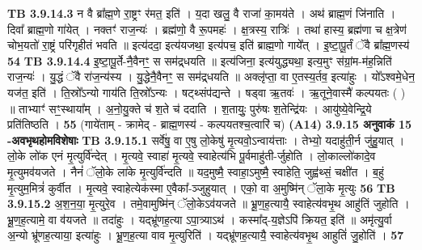 \documentclass[17pt]{extarticle}
\begin{document}
{{{{{{{{{{{{{{{{{{{{{{                  \newline
                                \textbf{ TB 3.9.14.3} \newline
                  न वै ब्रा᳚ह्म॒णे रा॒ष्ट्रꣳ र॑मत॒ इति॑ । य॒दा खलु॒ वै राजा॑ का॒मय॑ते । अथ॑ ब्राह्म॒णं जि॑नाति । दिवा᳚ ब्राह्म॒णो गा॑येत् । नक्तꣳ॑ राज॒न्यः॑ । ब्रह्म॑णो॒ वै रू॒पमहः॑ । क्ष॒त्रस्य॒ रात्रिः॑ । तथा॑ हास्य॒ ब्रह्म॑णा च क्ष॒त्रेण॑ चोभ॒यतो॑ रा॒ष्ट्रं परि॑गृहीतं भवति ॥ इत्य॑ददा॒ इत्य॑यजथा॒ इत्य॑पच॒ इति॑ ब्राह्म॒णो गाये᳚त् । इ॒ष्टा॒पू॒र्तं ॅवै ब्रा᳚ह्म॒णस्य॑ \textbf{ 54} \newline
                  \newline
                                \textbf{ TB 3.9.14.4} \newline
                  इ॒ष्टा॒पू॒र्ते-नै॒वैनꣳ॒॒ स सम॑द्र्धयति ॥ इत्य॑जिना॒ इत्य॑युद्ध्यथा॒ इत्य॒मुꣳ स॑ग्रां॒म-म॑ह॒न्निति॑ राज॒न्यः॑ । यु॒द्धं ॅवै रा॑ज॒न्य॑स्य । यु॒द्धेनै॒वैनꣳ॒॒ स सम॑द्र्धयति ॥ अक्लृ॑प्ता॒ वा ए॒तस्य॒र्तव॒ इत्या॑हुः । यो᳚ऽश्वमे॒धेन॒ यज॑त॒ इति॑ । ति॒स्रो᳚ऽन्यो गाय॑ति ति॒स्रो᳚ऽन्यः । षट्थ्संप॑द्यन्ते । षड्वा ऋ॒तवः॑ । ऋ॒तूने॒वास्मै॑ कल्पयतः ( ) ॥ ताभ्याꣳ॑ सꣳ॒॒स्थाया᳚म् । अ॒नो॒यु॒क्ते च॑ श॒ते च॑ ददाति । श॒तायुः॒ पुरु॑षः श॒तेन्द्रि॑यः । आयु॑ष्ये॒वेन्द्रि॒ये प्रति॑तिष्ठति । \textbf{ 55} \newline
                  \newline
                                    (गाये॑ताम् - क्रामेद् - ब्राह्म॒णस्य॑ - कल्पयतश्च॒त्वारि॑ च) \textbf{(A14)} \newline \newline
                \textbf{ 3.9.15    अनुवाकं   15 -अवभृथहोमविशेषाः} \newline
                                \textbf{ TB 3.9.15.1} \newline
                  सर्वे॑षु॒ वा ए॒षु लो॒केषु॑ मृ॒त्यवो॒ऽन्वाय॑त्ताः । तेभ्यो॒ यदाहु॑ती॒र्न जु॑हु॒यात् । लो॒के लो॑क एनं मृ॒त्युर्वि॑न्देत् । मृ॒त्यवे॒ स्वाहा॑ मृ॒त्यवे॒ स्वाहेत्य॑भि पू॒र्वमाहु॑ती-र्जुहोति । लो॒काल्लो॑कादे॒व मृ॒त्युमव॑यजते । नैनं॑ ॅलो॒के ला॑के मृ॒त्युर्वि॑न्दति ॥ यद॒मुष्मै॒ स्वाहा॒ऽमुष्मै॒ स्वाहेति॒ जुह्व॑थ्सं॒ चक्षी॑त । ब॒हुं मृ॒त्युम॒मित्रं॑ कुर्वीत । मृ॒त्यवे॒ स्वाहेत्येक॑स्मा ए॒वैका᳚-ञ्जुहुयात् । एको॒ वा अ॒मुष्मि॑न् ॅला॒के मृ॒त्युः \textbf{ 56} \newline
                  \newline
                                \textbf{ TB 3.9.15.2} \newline
                  अ॒श॒न॒या॒ मृ॒त्युरे॒व । तमे॒वामुष्मि॑न् ॅलो॒केऽव॑यजते ॥ भ्रू॒ण॒ह॒त्यायै॒ स्वाहेत्य॑वभृ॒थ आहु॑तिं जुहोति । भ्रू॒ण॒ह॒त्यामे॒ वा व॑यजते ॥ तदा॑हुः । यद्भ्रू॑णह॒त्या ऽपा॒त्र्याऽथ॑ । कस्मा᳚द्-य॒ज्ञेऽपि॑ क्रियत॒ इति॑ ॥ अमृ॑त्यु॒र्वा अ॒न्यो भ्रू॑णह॒त्याया॒ इत्या॑हुः । भ्रू॒ण॒ह॒त्या वाव मृ॒त्युरिति॑ । यद्भ्रू॑णह॒त्यायै॒ स्वाहेत्य॑वभृ॒थ आहुतिं॑ जु॒होति॑ । \textbf{ 57} \newline
}}}}}}}}}}}}}}}}}}}}}}
\end{document}
